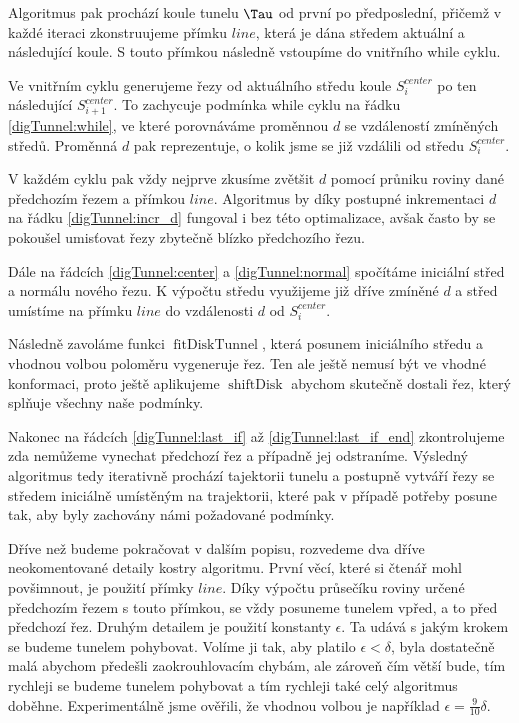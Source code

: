Algoritmus pak prochází koule tunelu $ \Tau $ od první po předposlední, přičemž
v každé iteraci zkonstruujeme přímku $ line $, která je dána středem aktuální
a následující koule. S touto přímkou následně vstoupíme do vnitřního while cyklu.

Ve vnitřním cyklu generujeme řezy od aktuálního středu koule $ S_{i}^{center} $
po ten následující $ S_{i + 1}^{center} $. To zachycuje podmínka
while cyklu na řádku \ref{digTunnel:while}, ve které porovnáváme proměnnou
$ d $ se vzdáleností zmíněných středů. Proměnná $ d $ pak reprezentuje,
o kolik jsme se již vzdálili od středu $ S_{i}^{center} $.

V každém cyklu pak vždy nejprve zkusíme zvětšit $ d $ pomocí průniku roviny dané
předchozím řezem a přímkou $ line $. Algoritmus by díky postupné inkrementaci
$ d $ na řádku \ref{digTunnel:incr_d} fungoval i bez této optimalizace, avšak často by
se pokoušel umisťovat řezy zbytečně blízko předchozího řezu.

Dále na řádcích \ref{digTunnel:center} a \ref{digTunnel:normal} spočítáme iniciální
střed a normálu nového řezu. K výpočtu středu využijeme již dříve zmíněné $ d $ a
střed umístíme na přímku $ line $ do vzdálenosti $ d $ od $ S_{i}^{center} $.

Následně zavoláme funkci $ \operatorname{fitDiskTunnel} $, která posunem iniciálního
středu a vhodnou volbou poloměru vygeneruje řez. Ten ale ještě nemusí být ve vhodné
konformaci, proto ještě aplikujeme $ \operatorname{shiftDisk} $ abychom skutečně
dostali řez, který splňuje všechny naše podmínky.

Nakonec na řádcích \ref{digTunnel:last_if} až \ref{digTunnel:last_if_end}
zkontrolujeme zda nemůžeme vynechat předchozí řez a případně jej odstraníme.
Výsledný algoritmus tedy iterativně prochází tajektorii tunelu a postupně vytváří řezy
se středem iniciálně umístěným na trajektorii, které pak v případě potřeby posune tak,
aby byly zachovány námi požadované podmínky.

Dříve než budeme pokračovat v dalším popisu, rozvedeme dva dříve neokomentované
detaily kostry algoritmu. První věcí, které si čtenář mohl povšimnout, je použití přímky
$ line $. Díky výpočtu průsečíku roviny určené předchozím řezem s touto přímkou, se
vždy posuneme tunelem vpřed, a to před předchozí řez. Druhým detailem je použití
konstanty $ \epsilon $. Ta udává s jakým krokem se budeme tunelem pohybovat.
Volíme ji tak, aby platilo  $ \epsilon < \delta $, byla dostatečně malá abychom
předešli zaokrouhlovacím chybám, ale zároveň čím větší bude, tím rychleji se
budeme tunelem pohybovat a tím rychleji také celý algoritmus doběhne. Experimentálně
jsme ověřili, že vhodnou volbou je například $ \epsilon = \frac{9}{10} \delta $.


